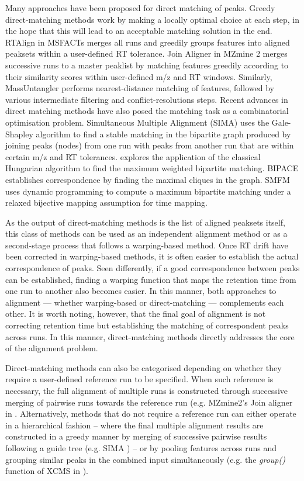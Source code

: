 Many approaches have been proposed for direct matching of peaks. Greedy direct-matching methods work by making a locally optimal choice at each step, in the hope that this will lead to an acceptable matching solution in the end. RTAlign in MSFACTs \cite{Duran2003} merges all runs and greedily groups features into aligned peaksets within a user-defined RT tolerance. Join Aligner \cite{Pluskal2010} in MZmine 2 merges successive runs to a master peaklist by matching features greedily according to their similarity scores within user-defined m/z and RT windows. Similarly, MassUntangler \cite{Ballardini2011} performs nearest-distance matching of features, followed by various intermediate filtering and conflict-resolutions steps. Recent advances in direct matching methods have also posed the matching task as a combinatorial optimisation problem. Simultaneous Multiple Alignment (SIMA) \cite{Voss2011a} uses the Gale-Shapley algorithm to find a stable matching in the bipartite graph produced by joining peaks (nodes) from one run with peaks from another run that are within certain m/z and RT tolerances. \cite{Wang2013} explores the application of the classical Hungarian algorithm to find the maximum weighted bipartite matching. BIPACE \cite{Hoffmann2012a} establishes correspondence by finding the maximal cliques in the graph. SMFM \cite{Lin2013} uses dynamic programming to compute a maximum bipartite matching under a relaxed bijective mapping assumption for time mapping.

As the output of direct-matching methods is the list of aligned peaksets itself, this class of methods can be used as an independent alignment method or as a second-stage process that follows a warping-based method. Once RT drift have been corrected in warping-based methods, it is often easier to establish the actual correspondence of peaks. Seen differently, if a good correspondence between peaks can be established, finding a warping function that maps the retention time from one run to another also becomes easier. In this manner, both approaches to alignment --- whether warping-based or direct-matching --- complements each other. It is worth noting, however, that the final goal of alignment is not correcting retention time but establishing the matching of correspondent peaks across runs. In this manner, direct-matching methods directly addresses the core of the alignment problem.

Direct-matching methods can also be categorised depending on whether they require a user-defined reference run to be specified. When such reference is necessary, the full alignment of multiple runs is constructed through successive merging of pairwise runs towards the reference run (e.g. MZmine2's Join aligner in \cite{Pluskal2010}. Alternatively, methods that do not require a reference run can either operate in a hierarchical fashion -- where the final multiple alignment results are constructed in a greedy manner by merging of successive pairwise results following a guide tree (e.g. SIMA \cite{Voss2011a}) -- or by pooling features across runs and grouping similar peaks in the combined input simultaneously (e.g. the \textit{group()} function of XCMS in \cite{Smith2006}).

